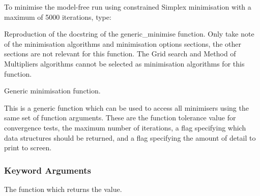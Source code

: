 











To minimise the model-free run 
 using constrained Simplex minimisation with a maximum of
5000 iterations, type:






Reproduction of the docstring of the generic\_minimise function.  Only take note of the
minimisation algorithms and minimisation options sections, the other sections are not
relevant for this function.  The Grid search and Method of Multipliers algorithms cannot be
selected as minimisation algorithms for this function.


Generic minimisation function.

This is a generic function which can be used to access all minimisers using the same set of
function arguments.  These are the function tolerance value for convergence tests, the maximum
number of iterations, a flag specifying which data structures should be returned, and a flag
specifying the amount of detail to print to screen.


\subsubsection{Keyword Arguments}

  The function which returns the value.

